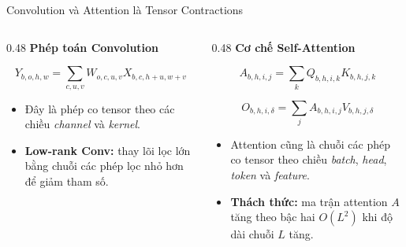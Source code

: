\begin{frame}{Convolution và Attention là Tensor Contractions}
    \begin{columns}[T,totalwidth=\textwidth]
        \begin{column}{0.48\textwidth}
            \centering
            \textbf{\color{blue}Phép toán Convolution}

            \[
                Y_{b,o,h,w}
                =
                \sum_{c,u,v}
                W_{o,c,u,v}
                X_{b,c,h+u,w+v}
            \]

            \begin{itemize}
                \small
                \item Đây là phép co tensor theo các chiều \textit{channel} và \textit{kernel}.
                \item \textbf{Low-rank Conv:} thay lõi lọc lớn bằng chuỗi các phép lọc nhỏ hơn để giảm tham số.
            \end{itemize}
        \end{column}

        \begin{column}{0.48\textwidth}
            \centering
            \textbf{\color{blue}Cơ chế Self-Attention}

            \[
                A_{b,h,i,j}
                =
                \sum_k
                Q_{b,h,i,k}
                K_{b,h,j,k}
            \]

            \[
                O_{b,h,i,\delta}
                =
                \sum_j
                A_{b,h,i,j}
                V_{b,h,j,\delta}
            \]

            \begin{itemize}
                \small
                \item Attention cũng là chuỗi các phép co tensor theo chiều \textit{batch}, \textit{head}, \textit{token} và \textit{feature}.
                \item \textbf{Thách thức:} ma trận attention $A$ tăng theo bậc hai $O(L^2)$ khi độ dài chuỗi $L$ tăng.
            \end{itemize}
        \end{column}
    \end{columns}
\end{frame}


